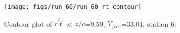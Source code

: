 \begin{figure}[H]
\centering
\texttt{[image: figs/run\_60/run\_60\_rt\_contour]}
\caption{Contour plot of $\overline{r^\prime t^\prime}$ at $z/c$=9.50, $V_{free}$=33.04, station 6.}
\end{figure}


